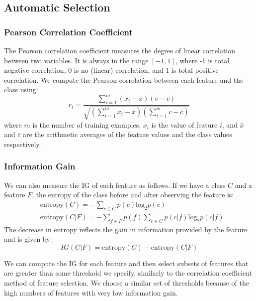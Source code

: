 \documentclass{article}
\begin{document}
\subsection{Automatic Selection}
\subsubsection{Pearson Correlation Coefficient}
The Pearson correlation coefficient measures the degree of linear correlation
between two variables. It is always in the range $[-1,1]$, where -1 is total
negative correlation, 0 is no (linear) correlation, and 1 is total positive
correlation. We compute the Pearson correlation between each feature and the
class using:
\begin{equation*}
r_i = \dfrac{\sum_{i=1}^m (x_i-\bar{x})(c-\bar{c})}{\sqrt{(\sum_{i=1}^m x_i-\bar{x})(\sum_{i=1}^m c-\bar{c})}}
\end{equation*}
where $m$ is the number of training examples, $x_i$ is the value of feature
$i$, and $\bar{x}$ and $\bar{c}$ are the arithmetic averages of the feature
values and the class values respectively.

\subsubsection{Information Gain}
We can also measure the IG of each feature as follows.
If we have a class $C$ and a feature $F$, the entropy of the
class before and after observing the feature is:
\begin{equation*}
\begin{aligned}
& \mathrm{entropy}(C) = - \sum_{c \in C} p(c) \mathrm{log}_2 p(c) \\
& \mathrm{entropy}(C|F) = - \sum_{f \in F} p(f) \sum_{c \in C} p(c|f) \mathrm{log}_2 p(c|f)
\end{aligned}
\end{equation*}
The decrease in entropy reflects the gain in information provided by the
feature and is given by:
\begin{equation*}
IG(C|F) = \mathrm{entropy}(C) - \mathrm{entropy}(C|F)
\end{equation*}

We can compute the IG for each feature and then select subsets of features that
are greater than some threshold we specify, similarly to the correlation
coefficient method of feature selection. We choose a similar set of thresholds
because of the high numbers of features with very low information gain.
\end{document}
